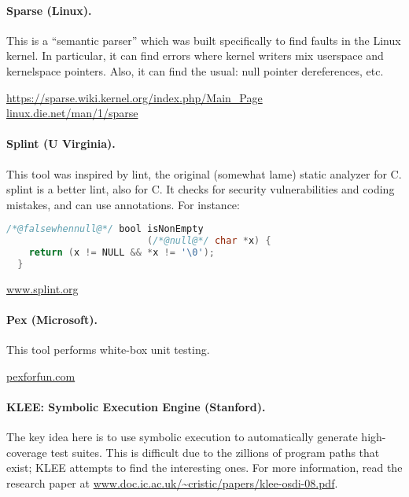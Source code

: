\documentclass[11pt]{article}
\begin{document}
\paragraph{Sparse (Linux).}
This is a ``semantic parser'' which was built specifically to find faults in the Linux kernel.
In particular, it can find errors where kernel writers mix userspace and kernelspace pointers.
Also, it can find the usual: null pointer dereferences, etc.

\begin{center}    
    \url{https://sparse.wiki.kernel.org/index.php/Main_Page}\\
    \url{linux.die.net/man/1/sparse}
\end{center}

\paragraph{Splint (U Virginia).} This tool was inspired by lint, the original
(somewhat lame) static analyzer for C. splint is a better lint, also for C.
It checks for security vulnerabilities and coding mistakes, and can use
annotations. For instance:

\begin{lstlisting}[language=C]
  /*@falsewhennull@*/ bool isNonEmpty
                         (/*@null@*/ char *x) {
    return (x != NULL && *x != '\0');
  }
    \end{lstlisting}

\begin{center}
    \url{www.splint.org}
  \end{center}

 \paragraph{Pex (Microsoft).} This tool performs white-box unit testing.
 
\begin{center}
  \url{pexforfun.com}
\end{center}

\paragraph{KLEE: Symbolic Execution Engine (Stanford).}
The key idea here is to use symbolic execution to automatically
generate high-coverage test suites.
This is difficult due to the zillions of program paths that exist;
KLEE attempts to  find the interesting ones.
For more information, read the research paper at
    \url{www.doc.ic.ac.uk/~cristic/papers/klee-osdi-08.pdf}.
\end{document}
